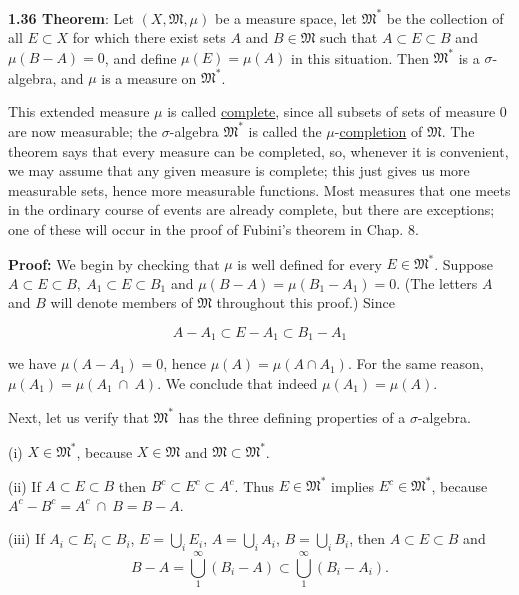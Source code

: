 \documentclass[11pt]{article}
\begin{document}
\label{org65fe6ea}
\textbf{\textbf{1.36 Theorem}}: Let \((X, \mathfrak{M}, \mu)\) be a measure space, let \(\mathfrak{M}^{ * }\) be the collection of all \(E \subset X\) for which there exist sets \(A\) and \(B \in \mathfrak{M}\) such that \(A \subset E \subset B\) and \(\mu(B - A) = 0\), and define \(\mu(E) = \mu(A)\) in this situation. Then \(\mathfrak{M}^{ * }\) is a \(\sigma\)-algebra, and \(\mu\) is a measure on \(\mathfrak{M}^{ * }\).

This extended measure \(\mu\) is called \uline{complete}, since all subsets of sets of measure 0 are now measurable; the \(\sigma\)-algebra \(\mathfrak{M}^{*}\) is called the \(\mu\)-\uline{completion} of \(\mathfrak{M}\). The theorem says that every measure can be completed, so, whenever it is convenient, we may assume that any given measure is complete; this just gives us more measurable sets, hence more measurable functions. Most measures that one meets in the ordinary course of events are already complete, but there are exceptions; one of these will occur in the proof of Fubini's theorem in Chap. 8.

\textbf{\textbf{Proof:}} We begin by checking that \(\mu\) is well defined for every \(E\in\mathfrak{M}^{*}\). Suppose \(A\subset E\subset B,\ A_{1}\subset E\subset B_{1}\) and \(\mu(B-A)=\mu(B_{1}-A_{1})=0\). (The letters \(A\) and \(B\) will denote members of \(\mathfrak{M}\) throughout this proof.) Since

\[A-A_{1}\subset E-A_{1}\subset B_{1}-A_{1}\]

we have \(\mu(A-A_{1})=0\), hence \(\mu(A)=\mu(A\cap A_{1})\). For the same reason, \(\mu(A_{1})=\mu(A_{1}\ \cap\ A)\). We conclude that indeed \(\mu(A_{1})=\mu(A)\).

Next, let us verify that \(\mathfrak{M}^{*}\) has the three defining properties of a \(\sigma\)-algebra.

(i) \(X\in\mathfrak{M}^{ * }\), because \(X\in\mathfrak{M}\) and \(\mathfrak{M}\subset\mathfrak{M}^{ * }\).

(ii) If \(A\subset E\subset B\) then \(B^{c}\subset E^{c}\subset A^{c}\). Thus \(E\in\mathfrak{M}^{ * }\) implies \(E^{c}\in\mathfrak{M}^{*}\), because \(A^{c}-B^{c}=A^{c}\ \cap\ B=B-A\).

(iii) If \(A_{i}\subset E_{i}\subset B_{i}\), \(E=\bigcup\limits_{i}E_{i}\), \(A=\bigcup\limits_{i}A_{i}\), \(B=\bigcup\limits_{i}B_{i}\), then \(A\subset E\subset B\) and
\[B-A=\bigcup\limits_{1}^{\infty}(B_{i}-A)\subset\bigcup\limits_{1}^{\infty}(B_{i}-A_{i}).\]
\end{document}
